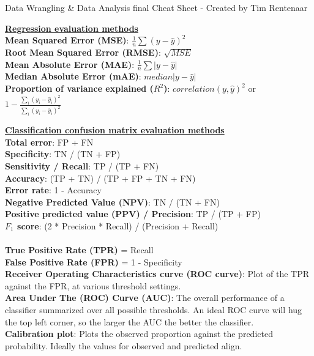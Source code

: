 \documentclass[a4paper,7pt,landscape]{extarticle}
\begin{document}
\begin{multicols}{3} %
\fontsize{6.2pt}{1pt}\selectfont

Data Wrangling \& Data Analysis final Cheat Sheet  - Created by Tim Rentenaar

\begin{boxA}
\underline{\textbf{Regression evaluation methods}}\\
\textbf{Mean Squared Error (MSE)}: $\frac{1}{n} \sum (y-\hat{y})^2$\\
\textbf{Root Mean Squared Error (RMSE)}: $\sqrt{MSE}$\\
\textbf{Mean Absolute Error (MAE)}: $\frac{1}{n} \sum |y-\hat{y}|$\\
\textbf{Median Absolute Error (mAE)}: $median|y-\hat{y}|$\\
\textbf{Proportion of variance explained ($R^2$)}: $correlation(y,\hat{y})^2$ or $1 - \frac{\sum_i (y_i - \hat{y}_i)^2}{\sum_i (y_i - \overline{y}_i)^2}$
\end{boxA}

\begin{boxA}
\underline{\textbf{Classification confusion matrix evaluation methods}}\\
\textbf{Total error}: FP + FN\\
\textbf{Specificity}: TN / (TN + FP)\\
\textbf{Sensitivity / Recall}: TP / (TP + FN)\\
\textbf{Accuracy}: (TP + TN)  / (TP + FP + TN + FN)\\
\textbf{Error rate}: 1 - Accuracy\\
\textbf{Negative Predicted Value (NPV)}: TN / (TN + FN)\\
\textbf{Positive predicted value (PPV) / Precision}: TP / (TP + FP)\\
\textbf{$F_1$ score}: (2 * Precision * Recall) / (Precision + Recall)\\\\
\textbf{True Positive Rate (TPR)} = Recall\\
\textbf{False Positive Rate (FPR)} = 1 - Specificity\\
\textbf{Receiver Operating Characteristics curve (ROC curve)}: Plot of the TPR against the FPR, at various threshold settings.\\
\textbf{Area Under The (ROC) Curve (AUC)}: The overall performance of a classifier summarized over all possible thresholds. An ideal ROC curve will hug the top left corner, so the larger the AUC the better the classifier.\\
\textbf{Calibration plot}: Plots the observed proportion against the predicted probability. Ideally the values for observed and predicted align.
\end{boxA}


\end{multicols}
\end{document}
